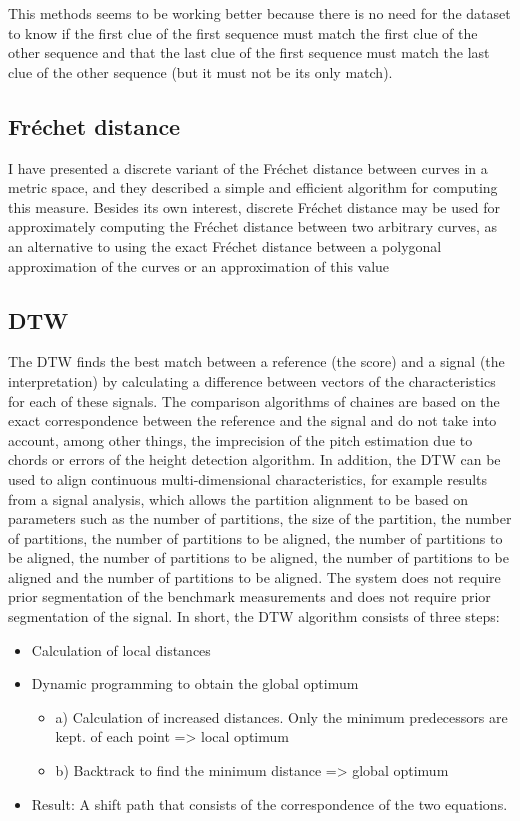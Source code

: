 \documentclass{article}
\begin{document}
This methods seems to be working better because there is no need for the dataset to know if the first clue of the first sequence must match the first clue of the other sequence and that
the last clue of the first sequence must match the last clue of the other sequence (but it must not be its only match).

\subsection{Fréchet distance}
I have presented a discrete variant of the Fréchet distance between curves in a metric
space, and they described a simple and efficient algorithm for computing this measure.
Besides its own interest, discrete Fréchet distance may be used for approximately computing the Fréchet distance between two arbitrary curves, as an alternative to using the exact Fréchet distance between a polygonal approximation of the curves or an approximation of this value

\subsection{DTW}

 The DTW finds the best match between a reference (the score) and a signal (the interpretation) by calculating a difference between vectors of the characteristics for each of these signals. The comparison algorithms of chaines are based on the exact correspondence between the reference and the signal and do not take into account, among other things, the imprecision of the pitch estimation due to chords or errors of the height detection algorithm. In addition, the DTW can be used to align continuous multi-dimensional characteristics, for example results from a signal analysis, which allows the partition alignment to be based on parameters such as the number of partitions, the size of the partition, the number of partitions, the number of partitions to be aligned, the number of partitions to be aligned, the number of partitions to be aligned, the number of partitions to be aligned and the number of partitions to be aligned.
The system does not require prior segmentation of the benchmark measurements and does not require prior segmentation of the
signal.
In short, the DTW algorithm consists of three steps:

\begin{itemize}
    \item Calculation of local distances
    \item Dynamic programming to obtain the global optimum \begin{itemize}
        \item a) Calculation of increased distances. Only the minimum predecessors are kept. of each point => local optimum
        \item b) Backtrack to find the minimum distance => global optimum
    \end{itemize}
    \item Result: A shift path that consists of the correspondence of the two equations.

    
\end{itemize}
\end{document}
